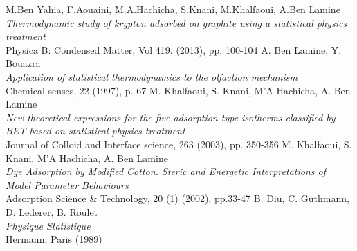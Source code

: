 \documentclass[12pt,a4paper]{article}
\begin{document}
\begin{thebibliography}{9}
	M.Ben Yahia, F.Aouaini, M.A.Hachicha, S.Knani, M.Khalfaoui, A.Ben Lamine\\
	\textit{Thermodynamic study of krypton adsorbed on graphite using a statistical physics treatment}\\
	Physica B: Condensed Matter, Vol 419. (2013), pp, 100-104
	A. Ben Lamine, Y. Bouazra\\
	\textit{Application of statistical thermodynamics to the olfaction mechanism}\\
	Chemical senses, 22 (1997), p. 67
	M. Khalfaoui, S. Knani, M'A Hachicha, A. Ben Lamine\\
	\textit{New theoretical expressions for the five adsorption type isotherms classified by BET based on statistical physics treatment}\\
	Journal of Colloid and Interface science, 263 (2003), pp. 350-356
	M. Khalfaoui, S. Knani, M'A Hachicha, A. Ben Lamine\\
	\textit{Dye Adsorption by Modified Cotton. Steric and Energetic Interpretations of Model Parameter Behaviours}\\
	Adsorption Science \& Technology, 20 (1) (2002), pp.33-47
	B. Diu, C. Guthmann, D. Lederer, B. Roulet\\
	\textit{Physique Statistique}\\
	Hermann, Paris (1989)
\end{thebibliography}
\end{document}

